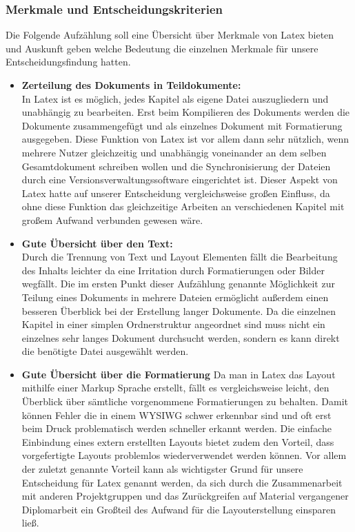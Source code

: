 \subsubsection{Merkmale und Entscheidungskriterien}
Die Folgende Aufzählung soll eine Übersicht über Merkmale von Latex bieten und Auskunft geben welche Bedeutung die einzelnen Merkmale für unsere Entscheidungsfindung hatten.
\begin{itemize}
\item \textbf{Zerteilung des Dokuments in Teildokumente:}\\
In Latex ist es möglich, jedes Kapitel als eigene Datei auszugliedern und unabhängig zu bearbeiten. Erst beim Kompilieren des Dokuments werden die Dokumente zusammengefügt und als einzelnes Dokument mit Formatierung ausgegeben.
Diese Funktion von Latex ist vor allem dann sehr nützlich, wenn mehrere Nutzer gleichzeitig und unabhängig voneinander an dem selben Gesamtdokument schreiben wollen und die Synchronisierung der Dateien durch eine Versionsverwaltungssoftware eingerichtet ist.
Dieser Aspekt von Latex hatte auf unserer Entscheidung vergleichsweise großen Einfluss, da ohne diese Funktion das gleichzeitige Arbeiten an verschiedenen Kapitel mit großem Aufwand verbunden gewesen wäre.
\item \textbf{Gute Übersicht über den Text:}\\
Durch die Trennung von Text und Layout Elementen fällt die Bearbeitung des Inhalts leichter da eine Irritation durch Formatierungen oder Bilder wegfällt.
Die im ersten Punkt dieser Aufzählung genannte Möglichkeit zur Teilung eines Dokuments in mehrere Dateien ermöglicht außerdem einen besseren Überblick bei der Erstellung langer Dokumente. Da die einzelnen Kapitel in einer simplen Ordnerstruktur angeordnet sind muss nicht ein einzelnes sehr langes Dokument durchsucht werden, sondern es kann direkt die benötigte Datei ausgewählt werden.
\item \textbf{Gute Übersicht über die Formatierung}
Da man in Latex das Layout mithilfe einer Markup Sprache erstellt, fällt es vergleichsweise leicht, den Überblick über sämtliche vorgenommene Formatierungen zu behalten. Damit können Fehler die in einem WYSIWG schwer erkennbar sind und oft erst beim Druck problematisch werden schneller erkannt werden.
Die einfache Einbindung eines extern erstellten Layouts bietet zudem den Vorteil, dass vorgefertigte Layouts problemlos wiederverwendet werden können.
Vor allem der zuletzt genannte Vorteil kann als wichtigster Grund für unsere Entscheidung für Latex genannt werden, da sich durch die Zusammenarbeit mit anderen Projektgruppen und das Zurückgreifen auf Material vergangener Diplomarbeit ein Großteil des Aufwand für die Layouterstellung einsparen ließ.

\end{itemize}

